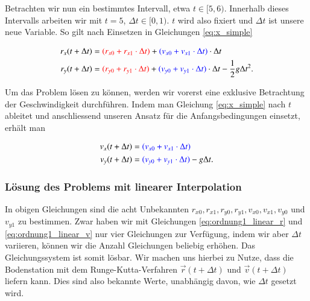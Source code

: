 Betrachten wir nun ein bestimmtes Intervall, etwa $t \in [5,6)$.
Innerhalb dieses Intervalls arbeiten wir mit $t=5$, $\Delta t \in [0,1)$.
$t$ wird also fixiert und $\Delta t$ ist unsere neue Variable.
So gilt nach Einsetzen in Gleichungen \eqref{eq:x_simple} 

\begin{equation}\label{eq:ordnung1_linear_r}
\begin{aligned}
r_x(t + \Delta t) &= \textcolor{red}{(r_{x0} +   r_{x1} \cdot \Delta t)} + \textcolor{blue}{(v_{x0} + v_{x1}  \cdot \Delta t)} \cdot \Delta t \\
r_y(t + \Delta t) &= \textcolor{red}{(r_{y0} +   r_{y1} \cdot \Delta t)} + \textcolor{blue}{(v_{y0} + v_{y1} \cdot \Delta t)} \cdot \Delta t - \frac{1}{2}g \Delta t^2.
\end{aligned}
\end{equation}

Um das Problem lösen zu können, werden wir vorerst eine exklusive Betrachtung der Geschwindigkeit durchführen.
Indem man Gleichung \ref{eq:x_simple} nach $t$ ableitet und anschliessend unseren Ansatz für die Anfangsbedingungen einsetzt, erhält man

\begin{equation}\label{eq:ordnung1_linear_v}
\begin{aligned}
v_x(t + \Delta t) &= \textcolor{blue}{(v_{x0} + v_{x1}  \cdot \Delta t)} \\
v_y(t+ \Delta t) &= \textcolor{blue}{(v_{y0} + v_{y1} \cdot \Delta t)} - g \Delta t.
\end{aligned}
\end{equation}

\subsubsection{Lösung des Problems mit linearer Interpolation}
\label{section:perturbation_ordnung1_linear}

In obigen Gleichungen sind die acht Unbekannten $r_{x0}, r_{x1}, r_{y0}, r_{y1}, v_{x0}, v_{x1}, v_{y0}$ und $v_{y1}$ zu bestimmen.
Zwar haben wir mit Gleichungen \ref{eq:ordnung1_linear_r} und \ref{eq:ordnung1_linear_v} nur vier Gleichungen zur Verfügung,
indem wir aber $\Delta t$ variieren, können wir die Anzahl Gleichungen beliebig erhöhen.
Das Gleichungssystem ist somit lösbar.
Wir machen uns hierbei zu Nutze, dass die Bodenstation mit dem Runge-Kutta-Verfahren $\vec{r}(t + \Delta t)$ und $\vec{v}(t + \Delta t)$ liefern kann.
Dies sind also bekannte Werte, unabhängig davon, wie $\Delta t$ gesetzt wird.


